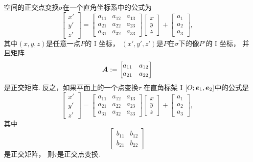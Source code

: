 \begin{theorem}
空间的正交点变换\(\sigma\)在一个直角坐标系中的公式为\begin{equation*}
	\begin{bmatrix}
		x' \\ y' \\ z'
	\end{bmatrix}
	= \begin{bmatrix}
		a_{11} & a_{12} & a_{13} \\
		a_{21} & a_{22} & a_{23} \\
		a_{31} & a_{32} & a_{33}
	\end{bmatrix}
	\begin{bmatrix}
		x \\ y \\ z
	\end{bmatrix}
	+ \begin{bmatrix}
		a_1 \\ a_2 \\ a_3
	\end{bmatrix},
\end{equation*}
其中\((x,y,z)\)是任意一点\(P\)的 I 坐标，
\((x',y',z')\)是\(P\)在\(\sigma\)下的像\(P'\)的 I 坐标，
并且矩阵\begin{equation*}
	\boldsymbol{A} := \begin{bmatrix}
		a_{11} & a_{12} \\
		a_{21} & a_{22}
	\end{bmatrix}
\end{equation*}
是正交矩阵.
反之，如果平面上的一个点变换\(\tau\)
在直角标架 I \([O;\boldsymbol{e}_1,\boldsymbol{e}_2]\)中的公式是\begin{equation*}
	\begin{bmatrix}
		x' \\ y' \\ z'
	\end{bmatrix}
	= \begin{bmatrix}
		a_{11} & a_{12} & a_{13} \\
		a_{21} & a_{22} & a_{23} \\
		a_{31} & a_{32} & a_{33}
	\end{bmatrix}
	\begin{bmatrix}
		x \\ y \\ z
	\end{bmatrix}
	+ \begin{bmatrix}
		a_1 \\ a_2 \\ a_3
	\end{bmatrix},
\end{equation*}
其中\begin{equation*}
	\begin{bmatrix}
		b_{11} & b_{12} \\
		b_{21} & b_{22}
	\end{bmatrix}
\end{equation*}
是正交矩阵，
则\(\tau\)是正交点变换.
\end{theorem}

